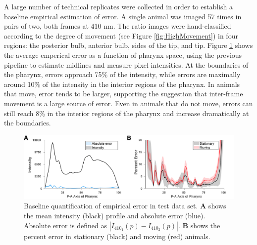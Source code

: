 A large number of technical replicates were collected in order to establish a baseline empirical estimation of error. A single animal was imaged 57 times in pairs of two, both frames at 410 nm. The ratio images were hand-classified according to the degree of movement (see Figure \ref{fig:HighMovement}) in four regions: the posterior bulb, anterior bulb, sides of the tip, and tip. 
Figure \ref{fig:ErrorInOldPipeline} shows the average emperical error as a function of pharynx space, using the previous pipeline to estimate midlines and measure pixel intensities. At the boundaries of the pharynx, errors approach 75\% of the intensity, while errors are maximally around 10\% of the intensity in the interior regions of the pharynx. In animals that move, error tends to be larger, supporting the suggestion that inter-frame movement is a large source of error. Even in animals that do not move, errors can still reach 8\% in the interior regions of the  pharynx and increase dramatically at the boundaries.


\begin{figure}
    \centering
    \includegraphics[scale=0.30]{Figures/rendered_files/error_and_intensity}
    \decoRule
    \caption[Errors in old pipeline]{Baseline quantification of empirical error in test data set. \textbf{A} shows the mean intensity (black) profile and absolute error (blue). Absolute error is defined as $|I_{410_1}(p)-I_{410_2}(p)|$. \textbf{B} shows the percent error in stationary (black) and moving (red) animals.}
    \label{fig:ErrorInOldPipeline}
\end{figure}


